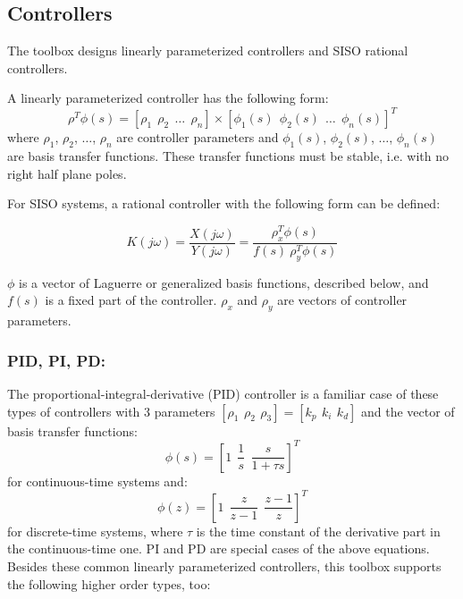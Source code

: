 \documentclass [12pt , a4paper] {report}
\begin{document}
\subsection{Controllers}

The toolbox designs linearly parameterized controllers and SISO rational controllers.

A linearly parameterized controller has the following form:
\begin{equation}
\label{linparcon}
\rho^T \phi(s)=[\rho_1 \: \: \rho_2 \: \: \ldots \:\: \rho_n]\times [\phi_1(s) \: \: \phi_2(s) \:\: \ldots \:\: \phi_n(s)]^T
\end{equation}
where $\rho_1$, $\rho_2$, $\ldots$, $\rho_n$ are controller parameters and $\phi_1(s)$, $\phi_2(s)$, $\ldots$, $\phi_n(s)$ are basis transfer functions. These transfer functions must be stable, i.e. with no right half plane poles.

For SISO systems, a rational controller with the following form can be defined:

\begin{equation}
    K(j\omega) = \frac{X(j\omega)}{Y(j\omega)} = \frac{\rho_x^T \phi (s)}{f(s) \ \rho_y^T \phi (s)}
\end{equation}

$\phi$ is a vector of Laguerre or generalized basis functions, described below, and $f(s)$ is a fixed part of the controller. $\rho_x$ and $\rho_y$ are vectors of controller parameters.

\subsubsection{PID, PI, PD:}

The proportional-integral-derivative (PID) controller is a familiar case of these types of controllers with 3 parameters $[\rho_1 \:\, \rho_2 \:\, \rho_3]=[k_p \:\, k_i \:\, k_d]$ and the vector of basis transfer functions:
\begin{equation}
\phi (s)=[1 \:\: \frac{1}{s} \:\: \frac{s}{1+\tau s}]^T
\end{equation}
for continuous-time systems and:
\begin{equation}
\phi (z)=[1 \:\: \frac{z}{z-1} \:\: \frac{z-1}{z}]^T 
\end{equation}
for discrete-time systems, where $\tau$ is the time constant of the derivative part in the continuous-time one. PI and PD are special cases of the above equations. Besides these common linearly parameterized controllers, this toolbox supports the following higher order types, too: 
\end{document}
